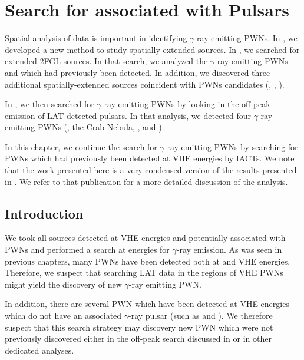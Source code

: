 \chapter{Search for  associated with \tev Pulsars}


Spatial analysis of \fermi data is important in identifying
$\gamma$-ray emitting \acp{PWN}.  In , we
developed a new method to study spatially-extended sources.  In
, we searched for extended \ac{2FGL} sources.
In that search, we analyzed the $\gamma$-ray emitting \acp{PWN}
 and \mshfifteenfiftytwo which had previously been detected.
In addition, we discovered three additional spatially-extended \fermi
sources coincident with \acp{PWN} candidates (, ,
).

In , we then searched for $\gamma$-ray emitting \acp{PWN}
by looking in the off-peak emission of \ac{LAT}-detected pulsars. In
that analysis, we detected four $\gamma$-ray emitting \acp{PWN} (\velax,
the Crab Nebula, \mshfifteenfiftytwo, and \threecfiftyeight).

In this chapter, we continue the search for $\gamma$-ray emitting
\acp{PWN} by searching for \acp{PWN} which had previously been
detected at \ac{VHE} energies by \acp{IACT}. We note that the work
presented here is a very condensed version of the results presented in
\citep{acero_2013a_constraints-galactic}.  We refer to that publication
for a more detailed discussion of the analysis.

\section{Introduction}

We took all sources detected at \ac{VHE} energies and potentially
associated with \acp{PWN} and performed a search at \gev energies for
$\gamma$-ray emission. As was seen in previous chapters, many \acp{PWN}
have been detected both at \gev and \ac{VHE} energies. Therefore,
we suspect that searching \ac{LAT} data in the regions of \ac{VHE}
\acp{PWN} might yield the discovery of new $\gamma$-ray emitting \ac{PWN}.

In addition, there are several \ac{PWN} which have been detected at
\ac{VHE} energies which do not have an associated $\gamma$-ray pulsar
(such as  and ).  We therefore suspect that this
search strategy may discovery new \ac{PWN} which were not previously
discovered either in the off-peak search discussed in 
or in other dedicated analyses.

